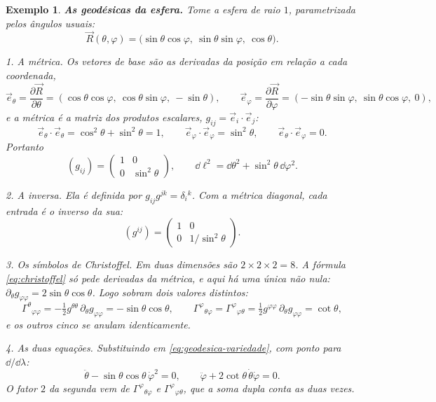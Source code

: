 \documentclass[12pt,a4paper,oneside]{book}
\theoremstyle{rgplain}
\newtheorem{example}{Exemplo}[chapter]
\theoremstyle{rgremark}
\begin{document}
\begin{example}
\label{ex:geodesicas-esfera}
\textbf{As geodésicas da esfera.} Tome a esfera de raio $1$, parametrizada
pelos ângulos usuais:
\[
  \vec R(\theta,\varphi)
  =\bigl(\sin\theta\cos\varphi,\ \sin\theta\sin\varphi,\ \cos\theta\bigr).
\]

\emph{1. A métrica.} Os vetores de base são as derivadas da posição em
relação a cada coordenada,
\[
  \vec e_\theta=\frac{\partial\vec R}{\partial\theta}
  =(\cos\theta\cos\varphi,\ \cos\theta\sin\varphi,\ -\sin\theta),
  \qquad
  \vec e_\varphi=\frac{\partial\vec R}{\partial\varphi}
  =(-\sin\theta\sin\varphi,\ \sin\theta\cos\varphi,\ 0),
\]
e a métrica é a matriz dos produtos escalares, $g_{ij}=\vec e_i\cdot\vec e_j$:
\[
  \vec e_\theta\cdot\vec e_\theta=\cos^2\theta+\sin^2\theta=1,
  \qquad
  \vec e_\varphi\cdot\vec e_\varphi=\sin^2\theta,
  \qquad
  \vec e_\theta\cdot\vec e_\varphi=0 .
\]
Portanto
\begin{equation}
  (g_{ij})=\begin{pmatrix}1&0\\0&\sin^2\theta\end{pmatrix},
  \qquad
  \dd\ell^2=\dd\theta^2+\sin^2\theta\,\dd\varphi^2 .
  \label{eq:metrica-esfera-unitaria}
\end{equation}

\emph{2. A inversa.} Ela é definida por $g_{ij}g^{jk}=\delta_i{}^k$. Com a
métrica diagonal, cada entrada é o inverso da sua:
\[
  (g^{ij})=\begin{pmatrix}1&0\\0&1/\sin^2\theta\end{pmatrix}.
\]

\emph{3. Os símbolos de Christoffel.} Em duas dimensões são
$2\times2\times2=8$. A fórmula \eqref{eq:christoffel} só pede derivadas da
métrica, e aqui há uma única não nula:
$\partial_\theta g_{\varphi\varphi}=2\sin\theta\cos\theta$. Logo sobram dois
valores distintos:
\[
  \Gamma^\theta{}_{\varphi\varphi}
  =-\tfrac12 g^{\theta\theta}\,\partial_\theta g_{\varphi\varphi}
  =-\sin\theta\cos\theta ,
  \qquad
  \Gamma^\varphi{}_{\theta\varphi}=\Gamma^\varphi{}_{\varphi\theta}
  =\tfrac12 g^{\varphi\varphi}\,\partial_\theta g_{\varphi\varphi}
  =\cot\theta ,
\]
e os outros cinco se anulam identicamente.

\emph{4. As duas equações.} Substituindo em
\eqref{eq:geodesica-variedade}, com ponto para $\dd/\dd\lambda$:
\begin{equation}
  \ddot\theta-\sin\theta\cos\theta\,\dot\varphi^2=0 ,
  \qquad
  \ddot\varphi+2\cot\theta\,\dot\theta\dot\varphi=0 .
  \label{eq:geodesicas-esfera}
\end{equation}
O fator $2$ da segunda vem de $\Gamma^\varphi{}_{\theta\varphi}$ e
$\Gamma^\varphi{}_{\varphi\theta}$, que a soma dupla conta as duas vezes.


\end{example}
\end{document}
